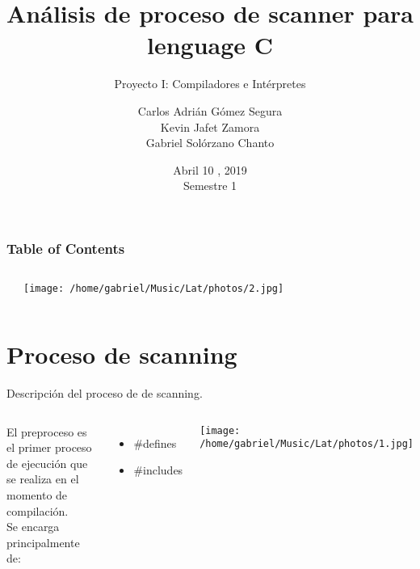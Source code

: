 \documentclass{beamer}
\title[] %
{An\'alisis de proceso de scanner para lenguage C}
\subtitle{Proyecto I: Compiladores e Intérpretes}
\institute{Tecnol\'ogico de Costa Rica \\
            Francisco Torres Rojas \\
}
\author{Carlos Adri\'an G\'omez Segura\\
        Kevin Jafet Zamora\\
        Gabriel Solórzano Chanto\\
    }
\date{ Abril 10 , 2019\\
        Semestre 1 }  %
\begin{document}
\frame{\titlepage}


\begin{frame}
\frametitle{Table of Contents}
\begin{columns}

\begin{center}
\tableofcontents    
\end{center}

\begin{center}
    \texttt{[image: /home/gabriel/Music/Lat/photos/2.jpg]}
\end{center}
\end{columns}
\end{frame}


\section{Proceso de scanning}

\begin{frame}{Descripción del proceso de de scanning.}
    

\begin{columns}

El preproceso es el primer proceso de ejecución que se realiza en el momento de compilación.\\

Se encarga principalmente de:
\begin{itemize}
\item \#defines
\item \#includes
\end{itemize}

\begin{center}
    \texttt{[image: /home/gabriel/Music/Lat/photos/1.jpg]}
\end{center}

\end{columns}
\end{frame}
\end{document}
